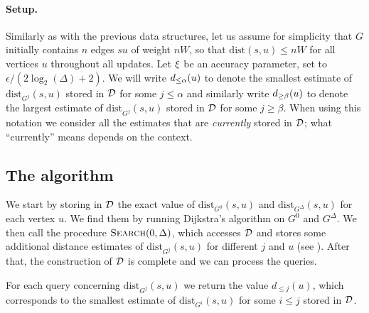 \documentclass[11pt,letterpaper]{article}
\theoremstyle{plain}
\newcommand{\eps}{\ensuremath{\epsilon}}
\newcommand{\dist}{\mathrm{dist}}
\begin{document}
\paragraph{Setup.}

Similarly as with the previous data structures, let us assume for simplicity that $G$ initially contains $n$ edges $su$ of weight $nW$, so that $\dist(s, u) \le nW$ for all vertices $u$ throughout all updates.
Let $\xi$ be an accuracy parameter, set to $\eps / (2 \log_2(\Delta) + 2)$.
We will write $d_{\le\alpha}(u)$ to denote the smallest estimate of $\dist_{G^j}(s,u)$ stored in $\mathcal{D}$ for some $j \le \alpha$
and similarly write $d_{\ge\beta}(u)$ to denote the largest estimate of $\dist_{G^j}(s,u)$ stored in $\mathcal{D}$ for some $j \ge \beta$.
When using this notation we consider all the estimates that are \emph{currently} stored in $\mathcal{D}$; what ``currently'' means depends on the context. 

\subsection{The algorithm}
We start by storing in $\mathcal{D}$ the exact value of $\dist_{G^0}(s, u)$ and $\dist_{G^\Delta}(s, u)$ for each vertex $u$.
We find them by running Dijkstra's algorithm on $G^0$ and $G^\Delta$.
We then call the procedure $\textproc{Search}(0, \Delta)$, which accesses $\mathcal{D}$ and stores some additional distance estimates of $\dist_{G^j}(s,u)$ for different $j$ and $u$ (see ).
After that, the construction of $\mathcal{D}$ is complete and we can process the queries.

For each query concerning $\dist_{G^j}(s,u)$ we return the value $d_{\le j}(u)$, which corresponds to the smallest estimate of $\dist_{G^i}(s,u)$ for some $i \le j$ stored in $\mathcal{D}$.
\end{document}
